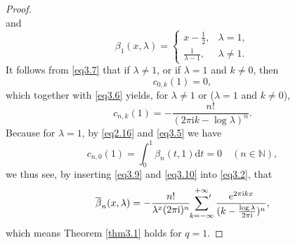 \documentclass[reqno]{amsart}
\numberwithin{equation}{section}
\begin{document}
\begin{proof}
\begin{equation}
\end{equation}
and
\begin{equation}\label{eq3.8}
\beta_{1}(x,\lambda)=\begin{cases}
x-\frac{1}{2},  &\lambda=1,\\
\frac{1}{\lambda-1},  &\lambda\not=1.
\end{cases}
\end{equation}
It follows from \eqref{eq3.7} that if $\lambda\neq1$, or if $\lambda=1$ and $k\neq0$, then
\begin{equation*}
c_{0,k}(1)=0,
\end{equation*}
which together with \eqref{eq3.6} yields, for $\lambda\neq1$ or ($\lambda=1$ and $k\neq0$),
\begin{equation}\label{eq3.9}
c_{n,k}(1)=-\frac{n!}{(2\pi\mathrm{i}k-\log\lambda)^{n}}.
\end{equation}
Because for $\lambda=1$, by \eqref{eq2.16} and \eqref{eq3.5} we have
\begin{equation}\label{eq3.10}
c_{n,0}(1)=\int_{0}^{1}\beta_{n}(t,1)\text{d}t=0\quad(n\in\mathbb{N}),
\end{equation}
we thus see, by inserting \eqref{eq3.9} and \eqref{eq3.10} into \eqref{eq3.2}, that
\begin{equation}\label{eq3.11}
\overline{\beta}_{n}(x,\lambda)=-\frac{n!}{\lambda^{x}(2\pi \mathrm{i})^{n}}\sideset{}{'}\sum_{k=-\infty}^{+\infty}\frac{e^{2\pi\mathrm{i}kx}}{(k-\frac{\log\lambda}{2\pi\mathrm{i}})^{n}},
\end{equation}
which means Theorem \ref{thm3.1} holds for $q=1$.


\end{proof}
\end{document}
